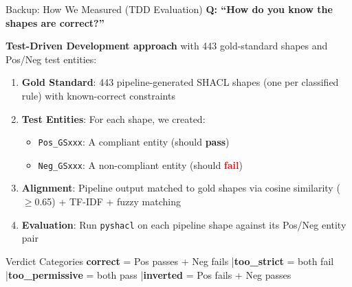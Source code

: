 \documentclass[aspectratio=169, 10pt]{beamer}
\begin{document}
\begin{frame}{Backup: How We Measured (TDD Evaluation)}
    \textbf{Q: ``How do you know the shapes are correct?''}

    \vspace{0.2cm}
    \textbf{Test-Driven Development approach} with 443 gold-standard shapes and Pos/Neg test entities:

    \vspace{0.2cm}
    \begin{enumerate}
        \item \textbf{Gold Standard}: 443 pipeline-generated SHACL shapes (one per classified rule) with known-correct constraints
        \item \textbf{Test Entities}: For each shape, we created:
        \begin{itemize}
            \item \texttt{Pos\_GSxxx}: A compliant entity (should \textcolor{green!60!black}{\textbf{pass}})
            \item \texttt{Neg\_GSxxx}: A non-compliant entity (should \textcolor{red}{\textbf{fail}})
        \end{itemize}
        \item \textbf{Alignment}: Pipeline output matched to gold shapes via cosine similarity ($\geq$0.65) + TF-IDF + fuzzy matching
        \item \textbf{Evaluation}: Run \texttt{pyshacl} on each pipeline shape against its Pos/Neg entity pair
    \end{enumerate}

    \vspace{0.3cm}
    \begin{alertblock}{Verdict Categories}
        \textbf{correct} = Pos passes + Neg fails \quad|\quad \textbf{too\_strict} = both fail \quad|\quad \textbf{too\_permissive} = both pass \quad|\quad \textbf{inverted} = Pos fails + Neg passes
    \end{alertblock}
\end{frame}
\end{document}
